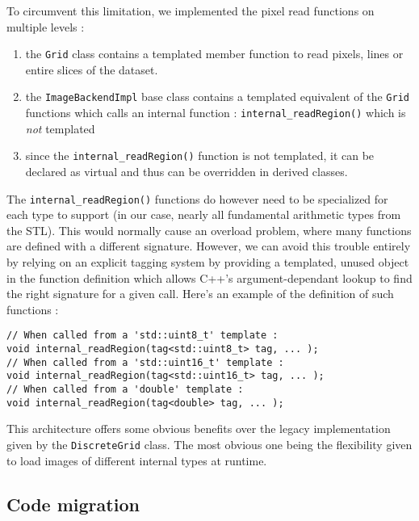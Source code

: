{{{			%
			To circumvent this limitation, we implemented the pixel read functions on multiple levels :\begin{enumerate}
				\item the \texttt{Grid} class contains a templated member function to read pixels, lines or entire slices of the dataset.
				\item the \texttt{ImageBackendImpl} base class contains a templated equivalent of the \texttt{Grid} functions which calls an internal function : \texttt{internal\_readRegion()} which is \textit{not} templated
				\item since the \texttt{internal\_readRegion()} function is not templated, it can be declared as virtual and thus can be overridden in derived classes.
			\end{enumerate}\par
			The \texttt{internal\_readRegion()} functions do however need to be specialized for each type to support (in our case, nearly all fundamental arithmetic types from the STL). This would normally cause an overload problem, where many functions are defined with a different signature. However, we can avoid this trouble entirely by relying on an explicit tagging system by providing a templated, unused object in the function definition which allows C++'s argument-dependant lookup to find the right signature for a given call. Here's an example of the definition of such functions :

			\begin{lstlisting}[style=cppbasicstyle, caption={Example of the explicit tagging system in use}]
// When called from a 'std::uint8_t' template :
void internal_readRegion(tag<std::uint8_t> tag, ... );
// When called from a 'std::uint16_t' template :
void internal_readRegion(tag<std::uint16_t> tag, ... );
// When called from a 'double' template :
void internal_readRegion(tag<double> tag, ... );
			\end{lstlisting}
		}

		This architecture offers some obvious benefits over the legacy implementation given by the \texttt{DiscreteGrid} class. The most obvious one being the flexibility given to load images of different internal types at runtime.
	}

	\subsection{Code migration}\label{text:03_software_components:01_image_representation:03_migration}
	{
	}
}

